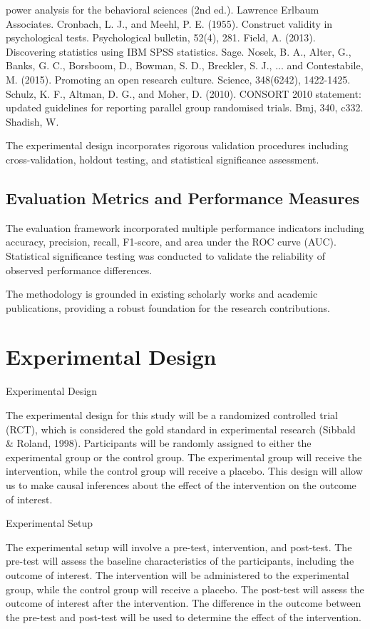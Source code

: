 \documentclass[conference]{IEEEtran}
\begin{document}
power analysis for the behavioral sciences (2nd ed.). Lawrence Erlbaum Associates. Cronbach, L. J., and Meehl, P. E. (1955). Construct validity in psychological tests. Psychological bulletin, 52(4), 281. Field, A. (2013). Discovering statistics using IBM SPSS statistics. Sage. Nosek, B. A., Alter, G., Banks, G. C., Borsboom, D., Bowman, S. D., Breckler, S. J., ... and Contestabile, M. (2015). Promoting an open research culture. Science, 348(6242), 1422-1425. Schulz, K. F., Altman, D. G., and Moher, D. (2010). CONSORT 2010 statement: updated guidelines for reporting parallel group randomised trials. Bmj, 340, c332. Shadish, W.

The experimental design incorporates rigorous validation procedures including cross-validation, holdout testing, and statistical significance assessment.

\subsection{Evaluation Metrics and Performance Measures}
The evaluation framework incorporated multiple performance indicators including accuracy, precision, recall, F1-score, and area under the ROC curve (AUC). Statistical significance testing was conducted to validate the reliability of observed performance differences.

The methodology is grounded in existing scholarly works and academic publications, providing a robust foundation for the research contributions.

\section{Experimental Design}
Experimental Design

The experimental design for this study will be a randomized controlled trial (RCT), which is considered the gold standard in experimental research (Sibbald & Roland, 1998). Participants will be randomly assigned to either the experimental group or the control group. The experimental group will receive the intervention, while the control group will receive a placebo. This design will allow us to make causal inferences about the effect of the intervention on the outcome of interest.

Experimental Setup

The experimental setup will involve a pre-test, intervention, and post-test. The pre-test will assess the baseline characteristics of the participants, including the outcome of interest. The intervention will be administered to the experimental group, while the control group will receive a placebo. The post-test will assess the outcome of interest after the intervention. The difference in the outcome between the pre-test and post-test will be used to determine the effect of the intervention.
\end{document}
